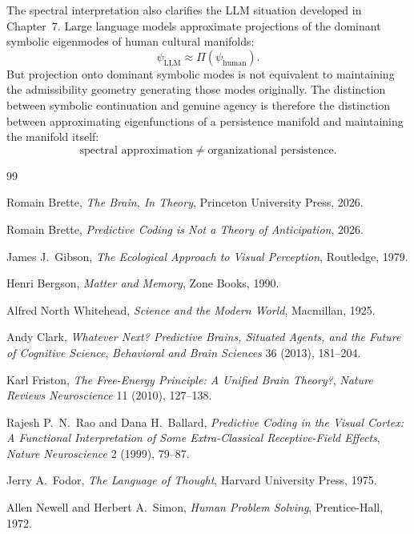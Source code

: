 \documentclass[12pt,a4paper]{report}
\theoremstyle{flyxion}
\begin{document}
The spectral interpretation also clarifies the LLM situation developed in Chapter~7. Large language models approximate projections of the dominant symbolic eigenmodes of human cultural manifolds:
\[
\psi_{\text{LLM}} \approx \Pi(\psi_{\text{human}}).
\]
But projection onto dominant symbolic modes is not equivalent to maintaining the admissibility geometry generating those modes originally. The distinction between symbolic continuation and genuine agency is therefore the distinction between approximating eigenfunctions of a persistence manifold and maintaining the manifold itself:
\[
\text{spectral approximation} \neq \text{organizational persistence}.
\]



\begin{thebibliography}{99}

Romain Brette,
\textit{The Brain, In Theory},
Princeton University Press, 2026.

Romain Brette,
\textit{Predictive Coding is Not a Theory of Anticipation},
2026.

James J.\ Gibson,
\textit{The Ecological Approach to Visual Perception},
Routledge, 1979.

Henri Bergson,
\textit{Matter and Memory},
Zone Books, 1990.

Alfred North Whitehead,
\textit{Science and the Modern World},
Macmillan, 1925.

Andy Clark,
\textit{Whatever Next? Predictive Brains, Situated Agents, and the Future of Cognitive Science},
\textit{Behavioral and Brain Sciences} 36 (2013), 181--204.

Karl Friston,
\textit{The Free-Energy Principle: A Unified Brain Theory?},
\textit{Nature Reviews Neuroscience} 11 (2010), 127--138.

Rajesh P.\ N.\ Rao and Dana H.\ Ballard,
\textit{Predictive Coding in the Visual Cortex: A Functional Interpretation of Some Extra-Classical Receptive-Field Effects},
\textit{Nature Neuroscience} 2 (1999), 79--87.

Jerry A.\ Fodor,
\textit{The Language of Thought},
Harvard University Press, 1975.

Allen Newell and Herbert A.\ Simon,
\textit{Human Problem Solving},
Prentice-Hall, 1972.


\end{thebibliography}
\end{document}
